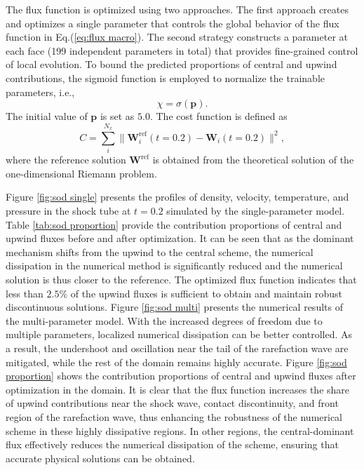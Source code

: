 \documentclass[preprint,3p,12pt,sort&compress]{elsarticle}
\begin{document}
The flux function is optimized using two approaches. 
The first approach creates and optimizes a single parameter that controls the global behavior of the flux function in Eq.(\ref{eq:flux macro}).
The second strategy constructs a parameter at each face (199 independent parameters in total) that provides fine-grained control of local evolution.
To bound the predicted proportions of central and upwind contributions, the sigmoid function is employed to normalize the trainable parameters, i.e.,
\begin{equation}
    \chi = \sigma(\mathbf p).
\end{equation}
The initial value of $\mathbf p$ is set as $5.0$.
The cost function is defined as
\begin{equation}
    C = \sum_i^{N_x} \|\mathbf W_i^{\mathrm{ref}}(t=0.2)-\mathbf W_i(t=0.2)\|^2,
\end{equation}
where the reference solution $\mathbf W^\mathrm{ref}$ is obtained from the theoretical solution of the one-dimensional Riemann problem.

Figure \ref{fig:sod single} presents the profiles of density, velocity, temperature, and pressure in the shock tube at $t=0.2$ simulated by the single-parameter model.
Table \ref{tab:sod proportion} provide the contribution proportions of central and upwind fluxes before and after optimization.
It can be seen that as the dominant mechanism shifts from the upwind to the central scheme, the numerical dissipation in the numerical method is significantly reduced and the numerical solution is thus closer to the reference.
The optimized flux function indicates that less than $2.5\%$ of the upwind fluxes is sufficient to obtain and maintain robust discontinuous solutions.
Figure \ref{fig:sod multi} presents the numerical results of the multi-parameter model.
With the increased degrees of freedom due to multiple parameters, localized numerical dissipation can be better controlled.
As a result, the undershoot and oscillation near the tail of the rarefaction wave are mitigated, while the rest of the domain remains highly accurate.
Figure \ref{fig:sod proportion} shows the contribution proportions of central and upwind fluxes after optimization in the domain.
It is clear that the flux function increases the share of upwind contributions near the shock wave, contact discontinuity, and front region of the rarefaction wave, thus enhancing the robustness of the numerical scheme in these highly dissipative regions.
In other regions, the central-dominant flux effectively reduces the numerical dissipation of the scheme, ensuring that accurate physical solutions can be obtained.
\end{document}
